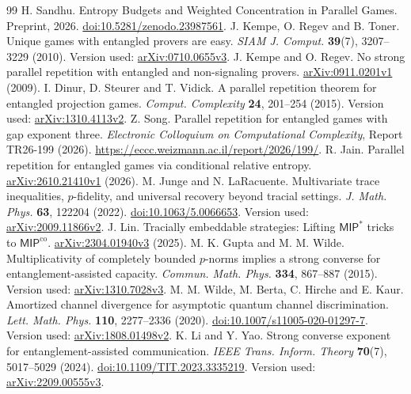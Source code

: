 \documentclass[11pt,reqno]{amsart}
\numberwithin{equation}{section}
\begin{document}
\begin{thebibliography}{99}
 H. Sandhu.
Entropy Budgets and Weighted Concentration in Parallel Games.
Preprint, 2026.
\href{https://doi.org/10.5281/zenodo.23987561}{doi:10.5281/zenodo.23987561}.
 J. Kempe, O. Regev and B. Toner.
Unique games with entangled provers are easy.
\emph{SIAM J. Comput.} \textbf{39}(7), 3207--3229 (2010).
Version used: \href{https://arxiv.org/abs/0710.0655v3}{arXiv:0710.0655v3}.
 J. Kempe and O. Regev.
No strong parallel repetition with entangled and non-signaling provers.
\href{https://arxiv.org/abs/0911.0201v1}{arXiv:0911.0201v1} (2009).
 I. Dinur, D. Steurer and T. Vidick.
A parallel repetition theorem for entangled projection games.
\emph{Comput. Complexity} \textbf{24}, 201--254 (2015).
Version used: \href{https://arxiv.org/abs/1310.4113v2}{arXiv:1310.4113v2}.
 Z. Song.
Parallel repetition for entangled games with gap exponent three.
\emph{Electronic Colloquium on Computational Complexity},
Report TR26-199 (2026).
\url{https://eccc.weizmann.ac.il/report/2026/199/}.
 R. Jain.
Parallel repetition for entangled games via conditional relative entropy.
\href{https://arxiv.org/abs/2610.21410v1}{arXiv:2610.21410v1} (2026).
 M. Junge and N. LaRacuente.
Multivariate trace inequalities, \(p\)-fidelity, and universal recovery beyond tracial settings.
\emph{J. Math. Phys.} \textbf{63}, 122204 (2022).
\href{https://doi.org/10.1063/5.0066653}{doi:10.1063/5.0066653}.
Version used: \href{https://arxiv.org/abs/2009.11866v2}{arXiv:2009.11866v2}.
 J. Lin.
Tracially embeddable strategies: Lifting \(\mathsf{MIP}^*\) tricks to \(\mathsf{MIP}^{\mathrm{co}}\).
\href{https://arxiv.org/abs/2304.01940v3}{arXiv:2304.01940v3} (2025).
 M. K. Gupta and M. M. Wilde.
Multiplicativity of completely bounded \(p\)-norms implies a strong converse for entanglement-assisted capacity.
\emph{Commun. Math. Phys.} \textbf{334}, 867--887 (2015).
Version used: \href{https://arxiv.org/abs/1310.7028v3}{arXiv:1310.7028v3}.
 M. M. Wilde, M. Berta, C. Hirche and E. Kaur.
Amortized channel divergence for asymptotic quantum channel discrimination.
\emph{Lett. Math. Phys.} \textbf{110}, 2277--2336 (2020).
\href{https://doi.org/10.1007/s11005-020-01297-7}{doi:10.1007/s11005-020-01297-7}.
Version used: \href{https://arxiv.org/abs/1808.01498v2}{arXiv:1808.01498v2}.
 K. Li and Y. Yao.
Strong converse exponent for entanglement-assisted communication.
\emph{IEEE Trans. Inform. Theory} \textbf{70}(7), 5017--5029 (2024).
\href{https://doi.org/10.1109/TIT.2023.3335219}{doi:10.1109/TIT.2023.3335219}.
Version used: \href{https://arxiv.org/abs/2209.00555v3}{arXiv:2209.00555v3}.
\end{thebibliography}
\end{document}
